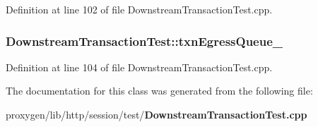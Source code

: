 Definition at line 102 of file Downstream\+Transaction\+Test.\+cpp.

\subsubsection[{txn\+Egress\+Queue\+\_\+}]{ Downstream\+Transaction\+Test\+::txn\+Egress\+Queue\+\_\+\hspace{0.3cm}{\ttfamily [protected]}}\label{classDownstreamTransactionTest_a949d1091b816665e2552186c5199f4d8}


Definition at line 104 of file Downstream\+Transaction\+Test.\+cpp.



The documentation for this class was generated from the following file\+:\begin{DoxyCompactItemize}
\item 
proxygen/lib/http/session/test/{\bf Downstream\+Transaction\+Test.\+cpp}\end{DoxyCompactItemize}
